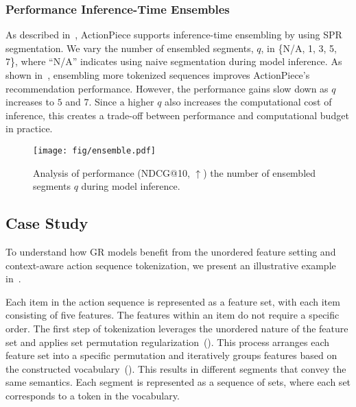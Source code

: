 \subsubsection{Performance \wrt Inference-Time Ensembles}\label{sec:inference_time_ensemble}

As described in~, ActionPiece supports inference-time ensembling by using SPR segmentation. We vary the number of ensembled segments, $q$, in \{N/A, 1, 3, 5, 7\}, where ``N/A'' indicates using naive segmentation during model inference. As shown in~, ensembling more tokenized sequences improves ActionPiece's recommendation performance. However, the performance gains slow down as $q$ increases to $5$ and $7$. Since a higher $q$ also increases the computational cost of inference, this creates a trade-off between performance and computational budget in practice.

\begin{figure}[t!]
    \begin{center}
    \texttt{[image: fig/ensemble.pdf]}
    \vskip -0.15in
    \caption{Analysis of performance (NDCG@10, $\uparrow$) \wrt the number of ensembled segments $q$ during model inference.}
    \label{fig:ensemble}
    \end{center}
    \vskip -0.25in
\end{figure}

\subsection{Case Study}\label{subsec:case}

To understand how GR models benefit from the unordered feature setting and context-aware action sequence tokenization, we present an illustrative example in~.

Each item in the action sequence is represented as a feature set, with each item consisting of five features. The features within an item do not require a specific order. The first step of tokenization leverages the unordered nature of the feature set and applies set permutation regularization~(). This process arranges each feature set into a specific permutation and iteratively groups features based on the constructed vocabulary~(). This results in different segments that convey the same semantics. Each segment is represented as a sequence of sets, where each set corresponds to a token in the vocabulary.

